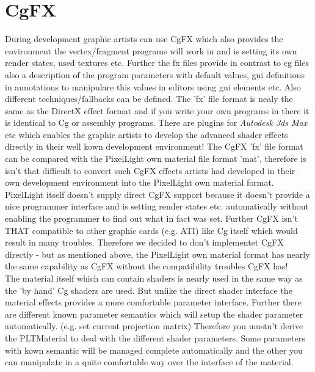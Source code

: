\section{CgFX}
During development graphic artists can use CgFX which also provides the environment the vertex/fragment
programs will work in and is setting its own render states, used textures etc. Further the fx files
provide in contrast to cg files also a description of the program parameters with default values, gui
definitions in annotations to manipulare this values in editors using gui elements etc.
Also different techniques/fallbacks can be defined. The 'fx' file format is nealy the same as the
DirectX effect format and if you write your own programs in there it is identical to Cg or assembly
programs. There are plugins for \emph{Autodesk 3ds Max} etc which enables the graphic artists to develop the
advanced shader effects directly in their well kown development environment! The CgFX 'fx' file format
can be compared with the PixelLight own material file format 'mat', therefore is isn't that difficult to 
convert such CgFX effects artists had developed in their own development environment into the
PixelLight own material format.\\

PixelLight itself doesn't supply direct CgFX support because it doesn't provide a nice programmer
interface and is setting render states etc. automatically without enabling the programmer to find
out what in fact was set. Further CgFX isn't THAT compatible to other graphic cards (e.g. ATI) like
Cg itself which would result in many troubles. Therefore we decided to don't implementet CgFX directly
- but as mentioned above, the PixelLight own material format has nearly the same capability as CgFX
without the compatibility troubles CgFX has!\\

The material itself which can contain shaders is nearly used in the same way as the 'by hand' Cg shaders
are used. But unlike the direct shader interface the material effects provides a more comfortable
parameter interface. Further there are different known parameter semantics which will setup the
shader parameter automatically. (e.g. set current projection matrix) Therefore you mustn't derive
the PLTMaterial to deal with the different shader parameters. Some parameters with kown semantic
will be managed complete automatically and the other you can manipulate in a quite comfortable way
over the interface of the material.\\




